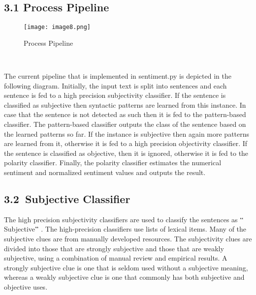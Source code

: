 \documentclass[12pt]{article}
\begin{document}
\subsection*{3.1  Process Pipeline}
\begin{Center}



\begin{figure}[H]
	\begin{Center}
		\texttt{[image: image8.png]}
		\caption{Process Pipeline}
		\label{fig:Process Pipeline}
	\end{Center}
\end{figure}



\\
\textbf{\textit{}}
\end{Center}\par


\vspace{\baselineskip}
The current pipeline that is implemented in sentiment.py is depicted in the following diagram. Initially, the input text is split into sentences and each sentence is fed to a high precision subjectivity classifier. If the sentence is classified as subjective then syntactic patterns are learned from this instance. In case that the sentence is not detected as such then it is fed to the pattern-based classifier. The pattern-based classifier outputs the class of the sentence based on the learned patterns so far. If the instance is subjective then again more patterns are learned from it, otherwise it is fed to a high precision objectivity classifier. If the sentence is classified as objective, then it is ignored, otherwise it is fed to the polarity classifier. Finally, the polarity classifier estimates the numerical sentiment and normalized sentiment values and outputs the result.\par

\subsection*{3.2\  Subjective Classifier}
The high precision subjectivity classifiers are used to classify the sentences as $``$Subjective$"$ . The high-precision classifiers use lists of lexical items. Many of the subjective clues are from manually developed resources. The subjectivity clues are divided into those that are strongly subjective and those that are weakly subjective, using a combination of manual review and empirical results. A strongly subjective clue is one that is seldom used without a subjective meaning, whereas a weakly subjective clue is one that commonly has both subjective and objective uses.\par
\end{document}
